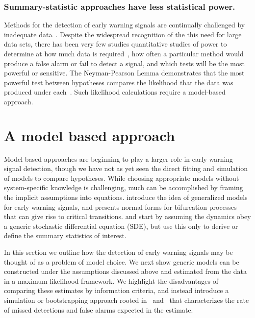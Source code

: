 \documentclass[authoryear,review,11pt]{elsarticle}
\begin{document}
\subsubsection*{Summary-statistic approaches have less statistical power.}
Methods for the detection of early warning signals are continually challenged by inadequate data~\citep{Inman2011, Scheffer2010,Held2004, Dakos2008, Scheffer2009, Guttal2008, Carpenter2011, Bestelmeyer2011}.
Despite the widespread recognition of the this need for large data sets,
there has been very few studies quantitative studies of power to determine at how much data is required~\citep{Contamin2009},
how often a particular method would produce a false alarm or fail to detect a signal,
and which tests will be the most powerful or sensitive.
The Neyman-Pearson Lemma demonstrates that the most powerful test between hypotheses
compares the likelihood that the data was produced under each~\citep{Neyman1933}.
Such likelihood calculations require a model-based approach.


\section{A model based approach}
Model-based approaches are beginning to play a larger role in early warning signal detection,
though we have not as yet seen the direct fitting and simulation of models to compare hypotheses.
While choosing appropriate models without system-specific knowledge is challenging,
much can be accomplished by framing the implicit assumptions into equations.
\citet{Lade2012} introduce the idea of generalized models for early warning signals, and
\citet{Kuehn2011} presents normal forms for bifurcation processes that can give rise to critical transitions.
\citet{Carpenter2011e} and \citet{Dakos2011a} start by assuming the dynamics obey a generic
stochastic differential equation (SDE), but use this only to derive or define the summary statistics of interest.

In this section we outline how the detection of early warning signals may be thought of
as a problem of model choice.
We next show generic models can be constructed under the assumptions discussed above
and estimated from the data in a maximum likelihood framework.
We highlight the disadvantages of comparing these estimates by information criteria,
and instead introduce a simulation or bootstrapping approach rooted in~\citet{Cox1961} and~\citet{McLachlan1987} that
characterizes the rate of missed detections and false alarms expected in the estimate.
\end{document}
